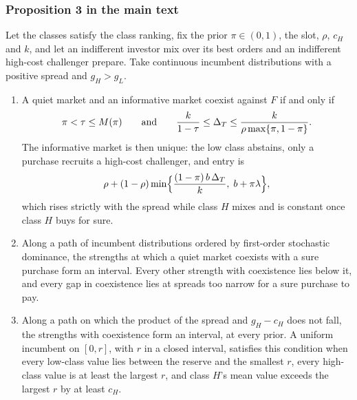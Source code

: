 \subsubsection*{Proposition 3 in the main text}
\setcounter{proposition}{2}
\begin{proposition}\label{prop:coexistence}
Let the classes satisfy the class ranking, fix the prior \(\pi\in(0,1)\), the slot, \(\rho\), \(c_H\) and \(k\), and let
an indifferent investor mix over its best orders and an indifferent high-cost challenger prepare. Take continuous
incumbent distributions with a positive spread and \(g_H>g_L\).
\begin{enumerate}[label=(\alph*),leftmargin=2em]
\item A quiet market and an informative market coexist against \(F\) if and only if
\[
\pi<\tau\le M(\pi)\qquad\text{and}\qquad\frac{k}{1-\tau}\le\Delta_T\le\frac{k}{\rho\max\{\pi,1-\pi\}} .
\]
The informative market is then unique: the low class abstains, only a purchase recruits a high-cost challenger,
and entry is
\[
\rho+(1-\rho)\min\Bigl\{\frac{(1-\pi)\,b\,\Delta_T}{k},\;b+\pi\lambda\Bigr\},
\]
which rises strictly with the spread while class \(H\) mixes and is constant once class \(H\) buys for sure.
\item Along a path of incumbent distributions ordered by first-order stochastic dominance, the strengths at which a
quiet market coexists with a sure purchase form an interval. Every other strength with coexistence lies below it,
and every gap in coexistence lies at spreads too narrow for a sure purchase to pay.
\item Along a path on which the product of the spread and \(g_H-c_H\) does not fall, the strengths with coexistence
form an interval, at every prior. A uniform incumbent on \([0,r]\), with \(r\) in a closed interval, satisfies this
condition when every low-class value lies between the reserve and the smallest \(r\), every high-class value is at
least the largest \(r\), and class \(H\)'s mean value exceeds the largest \(r\) by at least \(c_H\).
\end{enumerate}
\end{proposition}

